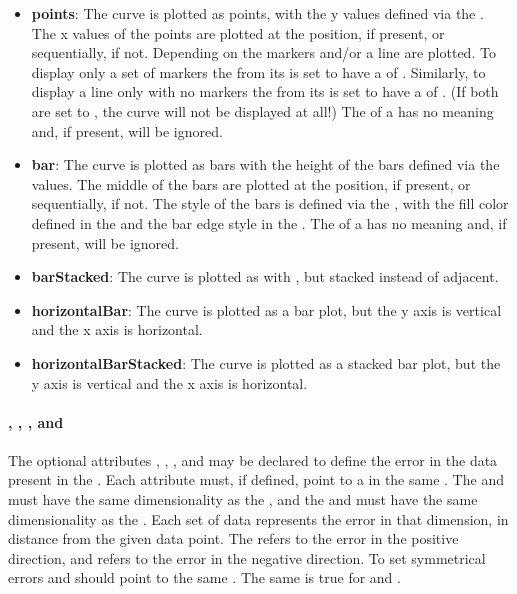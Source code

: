 \begin{blockChanged}
\begin{itemize}
\item \textbf{points}: The curve is plotted as points, with the y values defined via the .  The x values of the points are plotted at the  position, if present, or sequentially, if not.  Depending on the  markers and/or a line are plotted.  To display only a set of markers the \Line from its \Style is set to have a  of .  Similarly, to display a line only with no markers the \Marker from its \Style is set to have a  of .  (If both are set to , the curve will not be displayed at all!)  The \Fill of a \Style has no meaning and, if present, will be ignored.
\item \textbf{bar}: The curve is plotted as bars with the height of the bars defined via the  values.  The middle of the bars are plotted at the  position, if present, or sequentially, if not.  The style of the bars is defined via the , with the fill color defined in the \Fill and the bar edge style in the \Line.  The \Marker of a \Style has no meaning and, if present, will be ignored.
\item \textbf{barStacked}: The curve is plotted as with , but stacked instead of adjacent.
\item \textbf{horizontalBar}: The curve is plotted as a bar plot, but the y axis is vertical and the x axis is horizontal.
\item \textbf{horizontalBarStacked}: The curve is plotted as a stacked bar plot, but the y axis is vertical and the x axis is horizontal.
\end{itemize}

\paragraph*{, , , and }
The optional attributes , , , and  may be declared to define the error in the data present in the \Curve.  Each attribute must, if defined, point to a \DataGenerator in the same \SedDocument.  The  and  must have the same dimensionality as the , and the  and  must have the same dimensionality as the .  Each set of data represents the error in that dimension, in distance from the given data point.  The  refers to the error in the positive direction, and  refers to the error in the negative direction. To set symmetrical errors  and  should point to the same \DataGenerator.  The same is true for  and .



\end{blockChanged}
